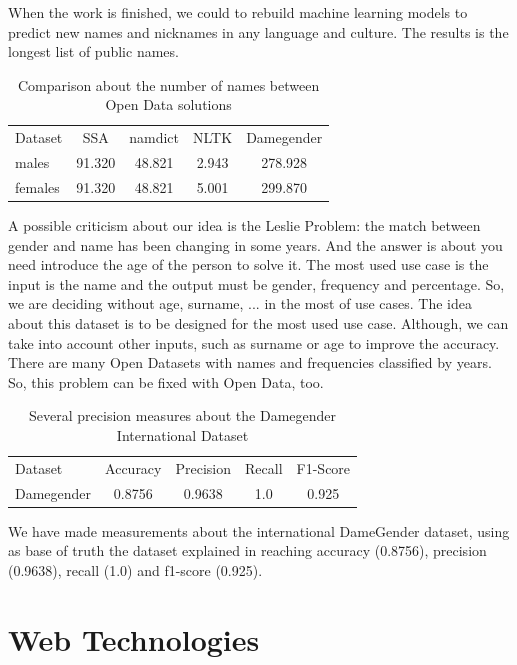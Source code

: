 \documentclass[a4paper]{article}
\begin{document}
When the work is finished, we could to rebuild machine learning models
to predict new names and nicknames in any language and culture. The
results is the longest list of public names.

\begin{table}[t]
\footnotesize
\begin{tabular}[]{lcccc}
  \hline
  Dataset & SSA & namdict & NLTK & Damegender \tabularnewline
  males & 91.320 & 48.821 & 2.943 & 278.928 \tabularnewline
  females & 91.320 & 48.821 & 5.001 & 299.870 \tabularnewline
  \hline
\end{tabular}
\caption{Comparison about the number of names between Open Data solutions}
\label{table:DifferentNamesMeasures}
\end{table}

A possible criticism about our idea is the Leslie
Problem\cite{blevins2015jane}: the match between gender and name has
been changing in some years. And the answer is about you need
introduce the age of the person to solve it. The most used use case is
the input is the name and the output must be gender, frequency and
percentage. So, we are deciding without age, surname, ... in the most
of use cases. The idea about this dataset is to be designed for the
most used use case. Although, we can take into account other inputs,
such as surname or age to improve the accuracy. There are many Open
Datasets with names and frequencies classified by years. So, this
problem can be fixed with Open Data, too.

\begin{table}[t]
\footnotesize
\begin{tabular}[]{lcccc}
  \hline
  Dataset  & Accuracy & Precision & Recall & F1-Score  \tabularnewline
  Damegender &  0.8756  & 0.9638    & 1.0    & 0.925  \tabularnewline
  \hline
\end{tabular}
\caption{Several precision measures about the Damegender International Dataset}
\label{table:DifferentAccuracyMeasures}
\end{table}

We have made measurements about the international DameGender dataset,
using as base of truth the dataset explained in
\cite{10.7717/peerj-cs.156} reaching accuracy (0.8756), precision
(0.9638), recall (1.0) and f1-score (0.925).

\section{Web Technologies}
\label{sec:webtech}
\end{document}
